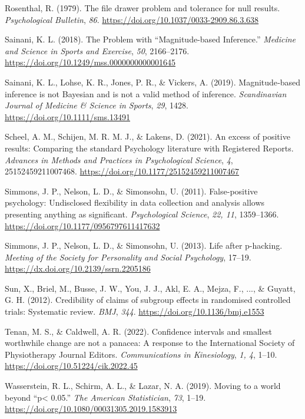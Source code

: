 \documentclass[]{cik}%
\newlength{\cslhangindent}
\newlength{\cslentryspacingunit} %
\newenvironment{CSLReferences}[2] %
 {%
  \setlength{\parindent}{0pt}
  \ifodd #1
  \let\oldpar\par
  \def\par{\hangindent=\cslhangindent\oldpar}
  \fi
  \setlength{\parskip}{#2\cslentryspacingunit}
 }%
 {}
\begin{document}
\begin{CSLReferences}{1}{0}
\leavevmode{}%
Rosenthal, R. (1979). The file drawer problem and tolerance for null
results. \emph{Psychological Bulletin}, \emph{86}.
\url{https://doi.org/10.1037/0033-2909.86.3.638}

\leavevmode{}%
Sainani, K. L. (2018). The Problem with {``Magnitude-based Inference.''}
\emph{Medicine and Science in Sports and Exercise}, \emph{50},
2166--2176. \url{https://doi.org/10.1249/mss.0000000000001645}

\leavevmode{}%
Sainani, K. L., Lohse, K. R., Jones, P. R., \& Vickers, A. (2019).
Magnitude‐based inference is not Bayesian and is not a valid method of
inference. \emph{Scandinavian Journal of Medicine \& Science in Sports},
\emph{29}, 1428. \url{https://doi.org/10.1111/sms.13491}

\leavevmode{}%
Scheel, A. M., Schijen, M. R. M. J., \& Lakens, D. (2021). An excess of
positive results: Comparing the standard Psychology literature with
Registered Reports. \emph{Advances in Methods and Practices in
Psychological Science}, \emph{4}, 25152459211007468.
\url{https://doi.org/10.1177/25152459211007467}

\leavevmode{}%
Simmons, J. P., Nelson, L. D., \& Simonsohn, U. (2011). False-positive
psychology: Undisclosed flexibility in data collection and analysis
allows presenting anything as significant. \emph{Psychological Science},
\emph{22, 11}, 1359--1366.
\url{https://doi.org/10.1177/0956797611417632}

\leavevmode{}%
Simmons, J. P., Nelson, L. D., \& Simonsohn, U. (2013). Life after
p-hacking. \emph{Meeting of the Society for Personality and Social
Psychology}, 17--19. \url{https://dx.doi.org/10.2139/ssrn.2205186}

\leavevmode{}%
Sun, X., Briel, M., Busse, J. W., You, J. J., Akl, E. A., Mejza, F.,
..., \& Guyatt, G. H. (2012). Credibility of claims of subgroup effects
in randomised controlled trials: Systematic review. \emph{BMJ},
\emph{344}. \url{https://doi.org/10.1136/bmj.e1553}

\leavevmode{}%
Tenan, M. S., \& Caldwell, A. R. (2022). Confidence intervals and
smallest worthwhile change are not a panacea: A response to the
International Society of Physiotherapy Journal Editors.
\emph{Communications in Kinesiology}, \emph{1, 4}, 1--10.
\url{https://doi.org/10.51224/cik.2022.45}

\leavevmode{}%
Wasserstein, R. L., Schirm, A. L., \& Lazar, N. A. (2019). Moving to a
world beyond {``p\textless{} 0.05.''} \emph{The American Statistician},
\emph{73}, 1--19. \url{https://doi.org/10.1080/00031305.2019.1583913}

\end{CSLReferences}

%
%

%
%
%
%
\end{document}
